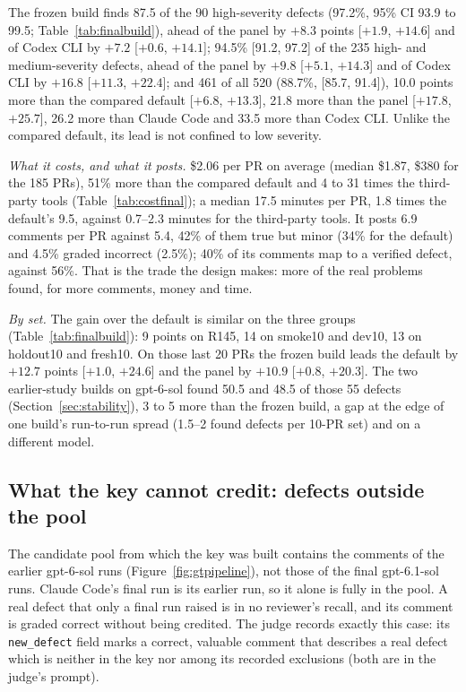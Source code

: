 \documentclass[11pt,a4paper]{article}
\newcommand{\code}[1]{\texttt{#1}}
\begin{document}
The frozen build finds 87.5 of the 90 high-severity defects (97.2\%, 95\%
CI 93.9 to 99.5; Table~\ref{tab:finalbuild}), ahead of the panel by $+8.3$
points [$+1.9$, $+14.6$] and of Codex CLI by $+7.2$ [$+0.6$, $+14.1$]; 94.5\%
[91.2, 97.2] of the 235 high- and medium-severity defects, ahead of the panel
by $+9.8$ [$+5.1$, $+14.3$] and of Codex CLI by $+16.8$ [$+11.3$, $+22.4$];
and 461 of all 520 (88.7\%, [85.7, 91.4]), 10.0 points more than the
compared default [$+6.8$, $+13.3$], 21.8 more than the panel [$+17.8$,
$+25.7$], 26.2 more than Claude Code and 33.5 more than Codex CLI. Unlike the
compared default, its lead is not confined to low severity.

\emph{What it costs, and what it posts.} \$2.06 per PR on average (median
\$1.87, \$380 for the 185 PRs), 51\% more than the compared default and 4 to
31 times the third-party tools (Table~\ref{tab:costfinal}); a median 17.5
minutes per PR, 1.8 times the default's 9.5, against 0.7--2.3 minutes for
the third-party tools. It posts 6.9 comments per PR against 5.4, 42\% of them
true but minor (34\% for the default) and 4.5\% graded incorrect (2.5\%);
40\% of its comments map to a verified defect, against 56\%. That is the
trade the design makes: more of the real problems found, for more comments,
money and time.

\emph{By set.} The gain over the default is similar on the three groups
(Table~\ref{tab:finalbuild}): 9 points on R145, 14 on smoke10 and dev10, 13
on holdout10 and fresh10. On those last 20 PRs the frozen build leads the
default by $+12.7$ points [$+1.0$, $+24.6$] and the panel by $+10.9$ [$+0.8$,
$+20.3$]. The two earlier-study builds on gpt-6-sol found 50.5 and 48.5 of
those 55 defects (Section~\ref{sec:stability}), 3 to 5 more than the frozen
build, a gap at the edge of one build's run-to-run spread (1.5--2 found
defects per 10-PR set) and on a different model.

\subsection{What the key cannot credit: defects outside the pool}
\label{sec:outofpool}

The candidate pool from which the key was built contains the comments of the
earlier gpt-6-sol runs (Figure~\ref{fig:gtpipeline}), not those of the final
gpt-6.1-sol runs. Claude Code's final run is its earlier run, so it alone is
fully in the pool. A real defect that only a final run raised is in no
reviewer's recall, and its comment is graded correct without being credited.
The judge records exactly this case: its \code{new\_defect} field marks a
correct, valuable comment that describes a real defect which is neither in
the key nor among its recorded exclusions (both are in the judge's prompt).
\end{document}
